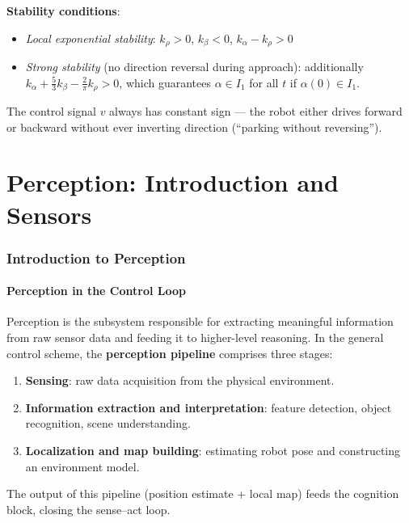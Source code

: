 \documentclass[11pt,a4paper]{article}
\theoremstyle{definition}
\theoremstyle{plain}
\theoremstyle{remark}
\begin{document}
\textbf{Stability conditions}:
\begin{itemize}
    \item \textit{Local exponential stability}: $k_\rho > 0$, $k_\beta < 0$, $k_\alpha - k_\rho > 0$
    \item \textit{Strong stability} (no direction reversal during approach): additionally $k_\alpha + \tfrac{5}{3}k_\beta - \tfrac{2}{\pi}k_\rho > 0$, which guarantees $\alpha \in I_1$ for all $t$ if $\alpha(0) \in I_1$.
\end{itemize}

The control signal $v$ always has constant sign — the robot either drives forward or backward without ever inverting direction (``parking without reversing'').



\part{Perception: Introduction and Sensors}

\section{Introduction to Perception}

\subsection{Perception in the Control Loop}

Perception is the subsystem responsible for extracting meaningful information from raw sensor data and feeding it to higher-level reasoning. In the general control scheme, the \textbf{perception pipeline} comprises three stages:

\begin{enumerate}
    \item \textbf{Sensing}: raw data acquisition from the physical environment.
    \item \textbf{Information extraction and interpretation}: feature detection, object recognition, scene understanding.
    \item \textbf{Localization and map building}: estimating robot pose and constructing an environment model.
\end{enumerate}

The output of this pipeline (position estimate + local map) feeds the cognition block, closing the sense--act loop.
\end{document}
